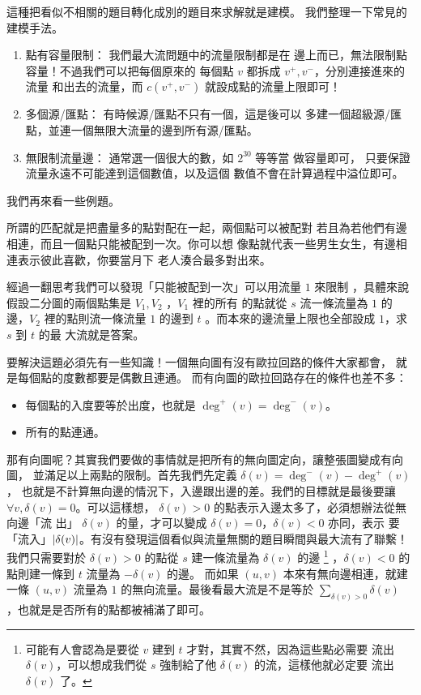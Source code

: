 \documentclass[a4paper,12pt]{book}
\begin{document}
這種把看似不相關的題目轉化成別的題目來求解就是建模。
我們整理一下常見的建模手法。
\begin{enumerate}
  \item 點有容量限制： 我們最大流問題中的流量限制都是在
    邊上而已，無法限制點容量！不過我們可以把每個原來的
    每個點 $v$ 都拆成 $v^+, v^-$，分別連接進來的流量
    和出去的流量，而 $c(v^+, v^-)$ 就設成點的流量上限即可！

  \item 多個源/匯點： 有時候源/匯點不只有一個，這是後可以
    多建一個超級源/匯點，並連一個無限大流量的邊到所有源/匯點。

  \item 無限制流量邊： 通常選一個很大的數，如 $2^{30}$ 等等當
    做容量即可， 只要保證流量永遠不可能達到這個數值，以及這個
    數值不會在計算過程中溢位即可。
\end{enumerate}
我們再來看一些例題。

所謂的匹配就是把盡量多的點對配在一起，兩個點可以被配對
若且為若他們有邊相連，而且一個點只能被配到一次。你可以想
像點就代表一些男生女生，有邊相連表示彼此喜歡，你要當月下
老人湊合最多對出來。

經過一翻思考我們可以發現「只能被配到一次」可以用流量 $1$ 來限制
，具體來說假設二分圖的兩個點集是 $V_1, V_2$ ，$V_1$ 裡的所有
的點就從 $s$ 流一條流量為 $1$ 的邊，$V_2$ 裡的點則流一條流量 $1$ 
的邊到 $t$ 。而本來的邊流量上限也全部設成 $1$，求 $s$ 到 $t$ 的最
大流就是答案。

要解決這題必須先有一些知識！一個無向圖有沒有歐拉回路的條件大家都會，
就是每個點的度數都要是偶數且連通。 而有向圖的歐拉回路存在的條件也差不多：
\begin{itemize}
  \item 每個點的入度要等於出度，也就是 $\deg^+(v) = \deg^-(v)$。
  \item 所有的點連通。
\end{itemize}
那有向圖呢？其實我們要做的事情就是把所有的無向圖定向，讓整張圖變成有向圖，
並滿足以上兩點的限制。首先我們先定義 $\delta(v) = \deg^-(v) - \deg^+(v)$，
也就是不計算無向邊的情況下，入邊跟出邊的差。我們的目標就是最後要讓 $\forall v, \delta(v) = 0
$。可以這樣想， $\delta(v) > 0$ 的點表示入邊太多了，必須想辦法從無向邊「流
出」 $\delta(v)$ 的量，才可以變成 $\delta(v) = 0$，$\delta(v) < 0$ 亦同，表示
要「流入」$\lvert \delta(v) \rvert$。有沒有發現這個看似與流量無關的題目瞬間與最大流有了聯繫！
我們只需要對於 $\delta(v) > 0$ 的點從 $s$ 建一條流量為 $\delta(v)$ 的邊
\footnote{可能有人會認為是要從 $v$ 建到 $t$ 才對，其實不然，因為這些點必需要
  流出 $\delta(v)$，可以想成我們從 $s$ 強制給了他 $\delta(v)$ 的流，這樣他就必定要
  流出 $\delta(v)$ 了。}
，$\delta(v) < 0$ 的點則建一條到 $t$ 流量為 $-\delta(v)$ 的邊。
而如果 $(u, v)$ 本來有無向邊相連，就建
一條 $(u, v)$ 流量為 $1$ 的無向流量。最後看最大流是不是等於 $\sum_{\delta(v) > 0} \delta(v)$ 
，也就是是否所有的點都被補滿了即可。
\end{document}
